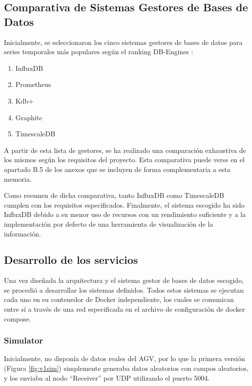 
\subsection{Comparativa de Sistemas Gestores de Bases de Datos}

Inicialmente, se seleccionaron los cinco sistemas gestores de bases de datos para series temporales más populares 
según el ranking DB-Engines \cite{dbengines:rankingTSDBMS}:
\begin{enumerate}
    \item InfluxDB
    \item Prometheus
    \item Kdb+
    \item Graphite
    \item TimescaleDB
\end{enumerate}

A partir de esta lista de gestores, se ha realizado una comparación exhaustiva de los mismos según los requisitos 
del proyecto. Esta comparativa puede verse en el apartado B.5 de los anexos que se incluyen de forma complementaria 
a esta memoria.

Como resumen de dicha comparativa, tanto InfluxDB como TimescaleDB cumplen con los requisitos especificados. Finalmente,
el sistema escogido ha sido InfluxDB debido a su menor uso de recursos con un rendimiento suficiente y a 
la implementación por defecto de una herramienta de visualización de la información.

\subsection{Desarrollo de los servicios}

Una vez diseñada la arquitectura y el sistema gestor de bases de datos escogido, se procedió a desarrollar los
sistemas definidos. Todos estos sistemas se ejecutan cada uno en su contenedor de Docker independiente, los cuales 
se comunican entre sí a través de una red especificada en el archivo de configuración de docker compose.

\subsubsection{Simulator}
Inicialmente, no disponía de datos reales del AGV, por lo que la primera versión (Figura \ref{fig:v1sim}) simplemente generaba datos aleatorios
con campos aleatorios, y los enviaba al nodo ``Receiver'' por UDP utilizando el puerto 5004.

